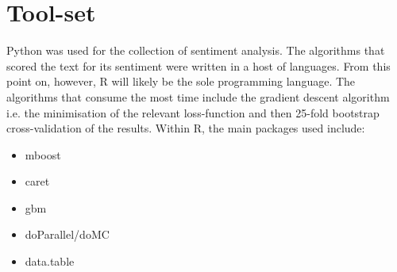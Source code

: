 \documentclass{article}
\begin{document}
\section{Tool-set}
\label{sec-3}

\noindent
Python was used for the collection of sentiment analysis. The algorithms that scored the text for its sentiment were written in a host of languages.
From this point on, however, R will likely be the sole programming language.
The algorithms that consume the most time include the gradient descent algorithm i.e. the minimisation of the relevant loss-function and then 25-fold bootstrap cross-validation of the results. Within R, the main packages used include:

\begin{itemize}
\item mboost
\item caret
\item gbm
\item doParallel/doMC
\item data.table
\end{itemize}
\end{document}
